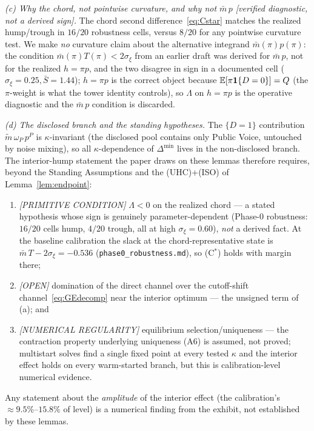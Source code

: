 \begin{remark}
\emph{(c) Why the chord, not pointwise curvature, and why not $\bar m\,p$
\textnormal{[verified diagnostic, not a derived sign]}.} The chord second
difference~\eqref{eq:Cstar} matches the realized hump/trough in $16/20$ robustness
cells, versus $8/20$ for any pointwise curvature test. We make \emph{no} curvature
claim about the alternative integrand $\bar m(\pi)p(\pi)$: the condition $\bar
m(\pi)T(\pi)<2\sigma_\xi$ from an earlier draft was derived for $\bar m\,p$, not
for the realized $h=\pi p$, and the two disagree in sign in a documented cell
($\sigma_\xi=0.25,\bar S=1.44$); $h=\pi p$ is the correct object because
$\mathbb{E}[\pi\mathbf{1}\{D=0\}]=Q$ (the $\pi$-weight is what the tower identity controls), so
$\Lambda$ on $h=\pi p$ is the operative diagnostic and the $\bar m\,p$ condition is
discarded.

\emph{(d) The disclosed branch and the standing hypotheses.} The $\{D=1\}$
contribution $\tilde m\,\omega_P\,p^{P}$ is $\kappa$-invariant (the disclosed pool
contains only Public Voice, untouched by noise mixing), so all $\kappa$-dependence of
$\Delta^{\min}$ lives in the non-disclosed branch. The interior-hump statement the
paper draws on these lemmas therefore requires, beyond the Standing Assumptions and
the (UHC)+(ISO) of Lemma~\ref{lem:endpoint}:
\begin{enumerate}
\item[(C$^\ast$)] \emph{[PRIMITIVE CONDITION]} $\Lambda<0$ on the realized chord
      --- a stated hypothesis whose sign is genuinely parameter-dependent (Phase-0
      robustness: $16/20$ cells hump, $4/20$ trough, all at high
      $\sigma_\xi=0.60$), \emph{not} a derived fact. At the baseline calibration
      the slack at the chord-representative state is $\bar m\,T-2\sigma_\xi=-0.536$
      (\texttt{phase0\_robustness.md}), so (C$^\ast$) holds with margin there;
\item[(GE)] \emph{[OPEN]} domination of the direct channel over the cutoff-shift
      channel~\eqref{eq:GEdecomp} near the interior optimum --- the unsigned term
      of (a); and
\item[(U)] \emph{[NUMERICAL REGULARITY]} equilibrium selection/uniqueness --- the
      contraction property underlying uniqueness (A6) is assumed, not proved;
      multistart solves find a single fixed point at every tested $\kappa$ and the
      interior effect holds on every warm-started branch, but this is
      calibration-level numerical evidence.
\end{enumerate}
Any statement about the \emph{amplitude} of the interior effect (the calibration's
$\approx9.5\%$--$15.8\%$ of level) is a numerical finding from the exhibit, not
established by these lemmas.
\end{remark}

